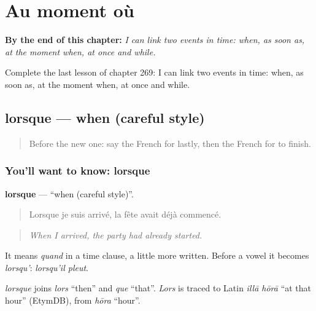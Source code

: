 
\chapter{Au moment où}
\label{ch:fr-au-moment-ou}

\begin{chapteropening}
\textbf{By the end of this chapter:} \emph{I can link two events in time: when, as soon as, at the moment when, at once and while.}

Complete the last lesson of chapter 269: I can link two events in time: when, as soon as, at the moment when, at once and while.
\end{chapteropening}

\section[lorsque]{lorsque — when (careful style)}

\label{lesson:FR-C269-lorsque}



\begin{quote}
Before the new one: say the French for lastly, then the French for to finish.
\end{quote}

\subsection*{You'll want to know: lorsque}
\textbf{lorsque} — \textquotedblleft{}when (careful style)\textquotedblright{}.

\begin{quote}
Lorsque je suis arrivé, la fête avait déjà commencé.
\end{quote}

\begin{quote}
\emph{When I arrived, the party had already started.}
\end{quote}

It means \emph{quand} in a time clause, a little more written. Before a vowel it becomes \emph{lorsqu'}: \emph{lorsqu'il pleut}.

\begin{cousinweb}
\emph{lorsque} joins \emph{lors} \textquotedblleft{}then\textquotedblright{} and \emph{que} \textquotedblleft{}that\textquotedblright{}. \emph{Lors} is traced to Latin \emph{illā hōrā} \textquotedblleft{}at that hour\textquotedblright{} (EtymDB), from \emph{hōra} \textquotedblleft{}hour\textquotedblright{}.
\end{cousinweb}

